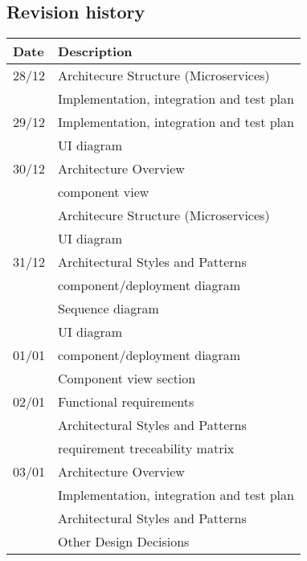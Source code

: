 \subsection{Revision history}
\label{sec:history}

\begin{center}
    \setlength\arrayrulewidth{1pt}
    \begin{longtable}{ll}
        
        \hline
        \rowcolor{myblue}\color{white}Date & \color{white}Description \\
        \hline
        28/12 & Architecure Structure (Microservices) \\
                & Implementation, integration and test plan \\
        \hline
        29/12 & Implementation, integration and test plan \\
                & UI diagram \\
        \hline
        30/12 & Architecture Overview \\
                & component view \\
                & Architecure Structure (Microservices) \\
                & UI diagram \\
        \hline
        31/12 & Architectural Styles and Patterns \\
                & component/deployment diagram \\
                & Sequence diagram \\
                & UI diagram \\
        \hline
        01/01 & component/deployment diagram \\
         & Component view section \\
        \hline
        02/01 & Functional requirements \\
         & Architectural Styles and Patterns \\
         & requirement treceability matrix \\
        \hline
        03/01 & Architecture Overview \\
         & Implementation, integration and test plan \\
         & Architectural Styles and Patterns \\
         & Other Design Decisions \\

\end{longtable}
\end{center}
